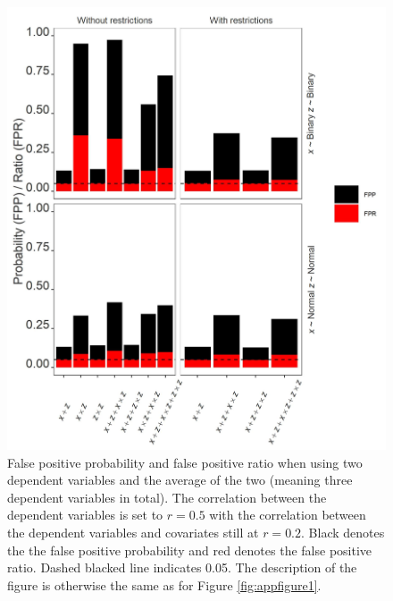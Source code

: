 \begin{figure}[hbt!]
\includegraphics{R/Analysis/Result/Figures/Figure3SI.jpeg}
\centering
\caption{False positive probability and false positive ratio when using two dependent variables and the average of the two (meaning three dependent variables in total). The correlation between the dependent variables is set to  $\textit{r}=0.5$ with the correlation between the dependent variables and covariates still at  $\textit{r}=0.2$. Black denotes the the false positive probability and red denotes the false positive ratio. Dashed blacked line indicates 0.05. The description of the figure is otherwise the same as for Figure \ref{fig:appfigure1}.}
\label{fig:appfigure3}
\end{figure}


